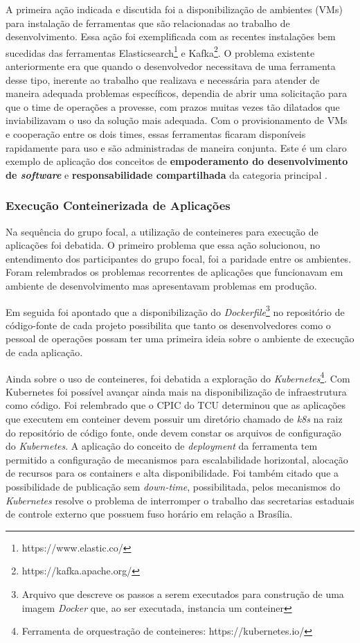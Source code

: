 A primeira ação indicada e discutida foi a disponibilização de ambientes (\acrshort{VM}s)
para instalação de ferramentas que são relacionadas ao trabalho de
desenvolvimento. Essa ação foi exemplificada com as recentes instalações bem
sucedidas das ferramentas Elasticsearch\footnote{https://www.elastic.co/} e Kafka\footnote{https://kafka.apache.org/}.
O problema existente anteriormente era que quando o desenvolvedor necessitava de
uma ferramenta desse tipo, inerente ao trabalho que realizava e necessária para
atender de maneira adequada problemas específicos, dependia de abrir uma
solicitação para que o time de operações a provesse, com prazos muitas vezes
tão dilatados que inviabilizavam o uso da solução mais adequada. Com o
provisionamento de \acrshort{VM}s e cooperação entre os dois times, essas
ferramentas ficaram disponíveis rapidamente para uso e são administradas de
maneira conjunta. Este é um claro exemplo de aplicação dos conceitos de
{\bf empoderamento do desenvolvimento de \emph{software}} e {\bf responsabilidade
compartilhada} da categoria principal .

\subsubsection{Execução Conteinerizada de Aplicações}

Na sequência do grupo focal, a utilização de conteineres para execução de
aplicações foi debatida. O primeiro problema que essa ação solucionou, no
entendimento dos participantes do grupo focal, foi a paridade entre os
ambientes. Foram relembrados os problemas recorrentes de aplicações que
funcionavam em ambiente de desenvolvimento mas apresentavam problemas em
produção.

Em seguida foi apontado que a disponibilização do {\it Dockerfile}\footnote{Arquivo
que descreve os passos a serem executados para construção de uma imagem
{\it Docker} que, ao ser executada, instancia um conteiner} no repositório de
código-fonte de cada projeto possibilita que tanto os desenvolvedores como o
pessoal de operações possam ter uma primeira ideia sobre o ambiente de execução
de cada aplicação.

Ainda sobre o uso de conteineres, foi debatida a exploração do {\it Kubernetes}\footnote{Ferramenta
de orquestração de conteineres: https://kubernetes.io/}. Com Kubernetes foi
possível avançar ainda mais na disponibilização de infraestrutura como código.
Foi relembrado que o \acrfull{CPIC} do \acrshort{TCU} determinou que as
aplicações que executem em conteiner devem possuir um diretório chamado de \emph{k8s}
na raiz do repositório de código fonte, onde devem constar os arquivos de
configuração do {\it Kubernetes}. A aplicação do conceito de {\it deployment} da
ferramenta tem permitido a configuração de mecanismos para escalabilidade
horizontal, alocação de recursos para os containers e alta disponibilidade. Foi
também citado que a possibilidade de publicação sem {\it down-time}, possibilitada,
pelos mecanismos do {\it Kubernetes} resolve o problema de interromper o
trabalho das secretarias estaduais de controle externo que possuem fuso horário
em relação a Brasília.

